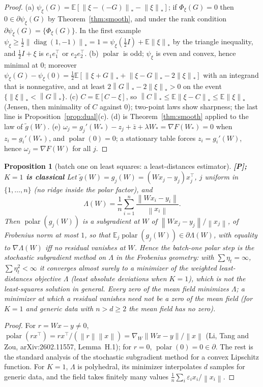 \documentclass[11pt]{article}
\newtheorem{proposition}[theorem]{Proposition}
\theoremstyle{definition}
\theoremstyle{remark}
\newcommand{\E}{\mathbb{E}}
\newcommand{\norm}[1]{\left\|#1\right\|}
\newcommand{\nnuc}[1]{\left\|#1\right\|_{*}}
\newcommand{\diag}{\operatorname{diag}}
\newcommand{\polar}{\operatorname{polar}}
\begin{document}
\begin{proof}
(a) $\psi_\xi(G)=\E[\nnuc{\xi-(-G)}-\nnuc\xi]$; if $\Phi_\xi(G)=0$ then $0\in\partial\psi_\xi(G)$ by
Theorem~\ref{thm:smooth}, and under the rank condition $\partial\psi_\xi(G)=\{\Phi_\xi(G)\}$. In the first example
$\psi_\xi\ge\frac12\nnuc{\diag(1,-1)}=1=\psi_\xi(\frac12I)+\E\nnuc\xi$ by the triangle inequality, and $\frac12I+\xi$ is
$e_1e_1^\top$ or $e_2e_2^\top$. (b) $\polar$ is odd; $\psi_\xi$ is even and convex, hence minimal at $0$; moreover
$\psi_\xi(G)-\psi_\xi(0)=\frac12\E[\nnuc{\xi+G}+\nnuc{\xi-G}-2\nnuc\xi]$ with an integrand that is nonnegative, and at
least $2\nnuc G-2\nnuc\xi>0$ on the event $\{\nnuc\xi<\nnuc G\}$. (c) $C=\E[C-\xi]$, so
$\nnuc C\le\E\nnuc{\xi-C}\le\E\nnuc\xi$ (Jensen, then minimality of $C$ against $0$); two-point laws show sharpness; the
last line is Proposition~\ref{prop:dual}(c). (d) is Theorem~\ref{thm:smooth} applied to the law of $\tilde g(W)$.
(e) $\omega_j=g_j'(W_\ast)-z_j+\bar z+\lambda W_\ast=\nabla F(W_\ast)=0$ when $z_i=g_i'(W_\ast)$, and $\polar(0)=0$; a
stationary table forces $z_i=g_i'(W)$, hence $\omega_j=\nabla F(W)$ for all $j$.
\end{proof}

\begin{proposition}[batch one on least squares: a least-distances estimator]\label{prop:lad} \textbf{[P]; $K=1$ is classical}
Let $\tilde g(W)=g_j(W)=(Wx_j-y_j)x_j^\top$, $j$ uniform in $\{1,\dots,n\}$ (no ridge inside the polar factor), and
\[
\Lambda(W)=\frac1n\sum_{i=1}^n\frac{\norm{Wx_i-y_i}}{\norm{x_i}} .
\]
Then $\polar(g_j(W))$ is a subgradient at $W$ of $\norm{Wx_j-y_j}/\norm{x_j}$, of Frobenius norm at most $1$, so that
$\E_j\polar(g_j(W))\in\partial\Lambda(W)$, with equality to $\nabla\Lambda(W)$ iff no residual vanishes at $W$. Hence the
batch-one polar step \emph{is} the stochastic subgradient method on $\Lambda$ in the Frobenius geometry: with
$\sum\eta_t=\infty$, $\sum\eta_t^2<\infty$ it converges almost surely to a minimizer of the weighted least-distances
objective $\Lambda$ (least absolute deviations when $K=1$), which is not the least-squares solution in general. Every
zero of the mean field minimizes $\Lambda$; a minimizer at which a residual vanishes need not be a zero of the mean
field (for $K=1$ and generic data with $n>d\ge2$ the mean field has no zero).
\end{proposition}
\begin{proof}
For $r=Wx-y\ne0$, $\polar(rx^\top)=rx^\top/(\norm r\norm x)=\nabla_W\norm{Wx-y}/\norm x$ (Li, Tang and Zou,
arXiv:2602.11557, Lemma~H.1); for $r=0$, $\polar(0)=0\in\partial$. The rest is the standard analysis of the stochastic
subgradient method for a convex Lipschitz function. For $K=1$, $\Lambda$ is polyhedral, its minimizer interpolates $d$
samples for generic data, and the field takes finitely many values $\frac1n\sum_i\varepsilon_ix_i/\norm{x_i}$.
\end{proof}
\end{document}
